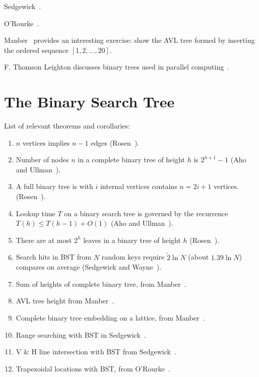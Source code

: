\documentclass{article}
\begin{document}
Sedgewick~\cite{sedgewick:r1990}.

O'Rourke~\cite{orourke:j1998}.

Manber~\cite[p. 87, Ex. 4.8]{manber:u1989} provides an interesting exercise:
show the AVL tree formed by inserting the ordered sequence $[1, 2, \ldots, 20]$.

F. Thomson Leighton discusses binary trees used in parallel computing~\cite[p. 407]{leighton:ft1992}.

\section{The Binary Search Tree}

List of relevant theorems and corollaries:

\begin{enumerate}
  \item $n$ vertices implies $n-1$ edges (Rosen~\cite[p. 752]{rosen}).
  \item Number of nodes $n$ in a complete binary tree of height $h$ is $2^{h+1} - 1$
    (Aho and Ullman~\cite[p. 257]{aho:av:1992}).
  \item A full binary tree is with $i$ internal vertices contains $n = 2i + 1$ vertices.
    (Rosen~\cite[p. 752]{rosen}).
  \item Lookup time $T$ on a binary search tree is governed by the recurrence
    $T(h) \leq T(h-1) + O(1)$ (Aho and Ullman~\cite[p. 256]{aho:av:1992}).
  \item There are at most $2^h$ leaves in a binary tree of height $h$ (Rosen~\cite[p. 754]{rosen}).
  \item Search hits in BST from $N$ random keys require $\tilde2\ln N$ (about $1.39\ln N$) compares
    on average (Sedgewick and Wayne~\cite[p. 403]{sedgewick:r2011}).
  \item Sum of heights of complete binary tree, from Manber~\cite[p. 34]{manber:u1989}.
  \item AVL tree height from Manber~\cite[p. 75]{manber:u1989}.
  \item Complete binary tree embedding on a lattice, from Manber~\cite[p. 263]{manber:u1989}.
  \item Range searching with BST in Sedgewick~\cite[p. 373]{sedgewick:r1990}.
  \item V \& H line intersection with BST from Sedgewick~\cite[p. 391]{sedgewick:r1990}.
  \item Trapezoidal locations with BST, from O'Rourke~\cite[p. 289]{orourke:j1998}.
\end{enumerate}
\end{document}
